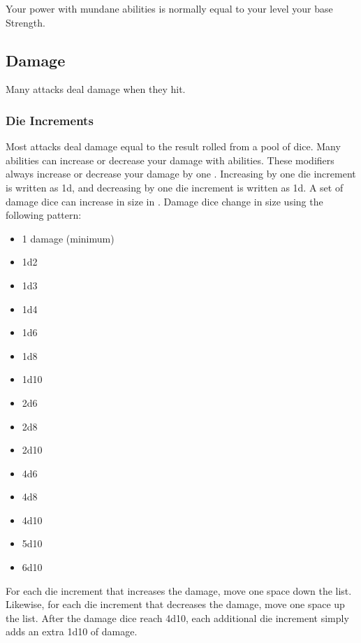         Your power with mundane abilities is normally equal to your level \add your base Strength.

    \subsection{Damage}\label{Damage}
        Many attacks deal damage when they hit.
        \subsubsection{Die Increments}\label{Die Increments}
            Most attacks deal damage equal to the result rolled from a pool of dice.
            Many abilities can increase or decrease your damage with abilities.
            These modifiers always increase or decrease your damage by one .
            Increasing by one die increment is written as \plus1d, and decreasing by one die increment is written as \minus1d.
            A set of damage dice can increase in size in .
            Damage dice change in size using the following pattern:
            \begin{itemize}
                \item 1 damage (minimum)
                \item 1d2
                \item 1d3
                \item 1d4
                \item 1d6
                \item 1d8
                \item 1d10
                \item 2d6
                \item 2d8
                \item 2d10
                \item 4d6
                \item 4d8
                \item 4d10
                \item 5d10
                \item 6d10
            \end{itemize}

            For each die increment that increases the damage, move one space down the list.
            Likewise, for each die increment that decreases the damage, move one space up the list.
            After the damage dice reach 4d10, each additional die increment simply adds an extra 1d10 of damage.

